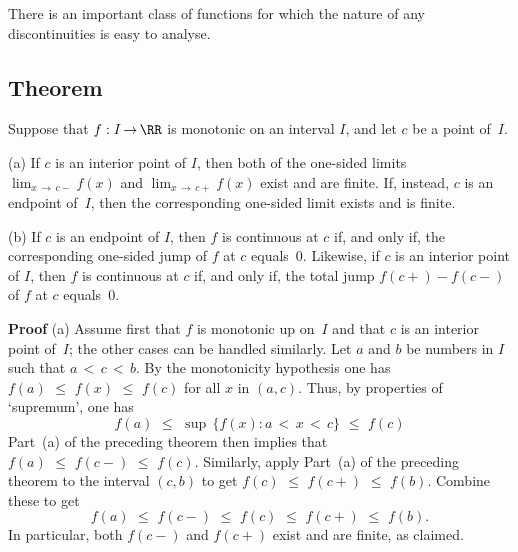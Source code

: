 \VV

        There is an important class of functions for which the nature of any discontinuities is easy to analyse.

\V


            \subsection{\small{\bf Theorem}}
            \label{ThmD60.60}
\V

        Suppose that $f:I \,{\rightarrow}\, {\RR}$ is monotonic on an interval $I$, and let $c$ be a point of~$I$.


        (a) If $c$ is an interior point of $I$, then both of the one-sided limits $\lim_{x \,{\rightarrow}\, c-} f(x)$ and
    $\lim_{x \,{\rightarrow}\, c+} f(x)$ exist and are finite. If, instead, $c$ is an endpoint of~$I$,
    then the corresponding one-sided limit exists and is finite.

\V

        (b) If $c$ is an endpoint of $I$, then $f$ is continuous at $c$ if, and only if, the corresponding one-sided jump of $f$ at $c$ equals~$0$.
    Likewise, if $c$ is an interior point of $I$, then $f$ is continuous at $c$ if, and only if, the total jump $f(c+)-f(c-)$ of $f$ at $c$ equals~$0$.

\V



        {\bf Proof} (a) Assume first that $f$ is monotonic up on~$I$ and that $c$ is an interior point of~$I$; the other cases can be handled similarly.
    Let $a$ and $b$ be numbers in $I$ such that $a\,<\,c\,<\,b$. By the monotonicity hypothesis one has
    $f(a)\,\,{\leq}\,\,f(x)\,\,{\leq}\,\,f(c)$ for all $x$ in $(a,c)$. Thus, by properties of `supremum', one has
        \begin{displaymath}
        f(a)\,\,{\leq}\,\,{\sup}\,\{f(x): a\,<\,x\,<\,c\}\,\,{\leq}\,\,f(c)
        \end{displaymath}
    Part~(a) of the preceding theorem then implies that $f(a)\,\,{\leq}\,\,f(c-)\,\,{\leq}\,\,f(c)$.
    Similarly, apply Part~(a) of the preceding theorem to the interval $(c,b)$ to get $f(c)\,\,{\leq}\,\,f(c+)\,\,{\leq}\,\,f(b)$. Combine these to get
        \begin{displaymath}
        f(a)\,\,{\leq}\,\,f(c-)\,\,{\leq}\,\,f(c)\,\,{\leq}\,\,f(c+)\,\,{\leq}\,\,f(b).
        \end{displaymath}
    In particular, both $f(c-)$ and $f(c+)$ exist and are finite, as claimed.

